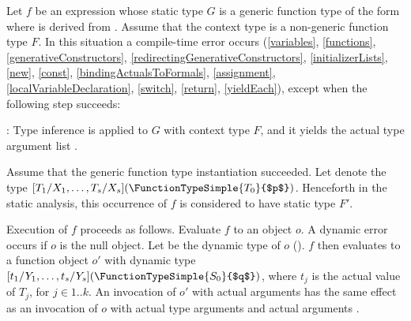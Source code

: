 \documentclass[makeidx]{article}
\begin{document}
{

\LMHash{}%
Let $f$ be an expression whose static type $G$ is
%
a generic function type of the form
where  is derived from .
Assume that the context type is a non-generic function type $F$.
In this situation a compile-time error occurs
(\ref{variables},
\ref{functions},
\ref{generativeConstructors},
\ref{redirectingGenerativeConstructors},
\ref{initializerLists},
\ref{new},
\ref{const},
\ref{bindingActualsToFormals},
\ref{assignment},
\ref{localVariableDeclaration},
\ref{switch},
\ref{return},
\ref{yieldEach}),
except when the following step succeeds:

\LMHash{}%
:
Type inference is applied to $G$ with context type $F$,
and it yields the actual type argument list
%
.


\LMHash{}%
Assume that the generic function type instantiation succeeded.
Let  denote the type
$[T_1/X_1, \ldots, T_s/X_s](\FunctionTypeSimple{T_0}{$p$})$.
Henceforth in the static analysis,
this occurrence of $f$ is considered to have static type $F'$.

\LMHash{}%
Execution of $f$ proceeds as follows.
Evaluate $f$ to an object $o$.
A dynamic error occurs if $o$ is the null object.
Let  be the dynamic type of $o$
().
$f$ then evaluates to a function object $o'$ with dynamic type
$[t_1/Y_1, \ldots, t_s/Y_s](\FunctionTypeSimple{S_0}{$q$})$,
where $t_j$ is the actual value of $T_j$, for $j \in 1 .. k$.
An invocation of $o'$ with actual arguments  has
the same effect as an invocation of $o$
with actual type arguments  and actual arguments .

}
\end{document}

